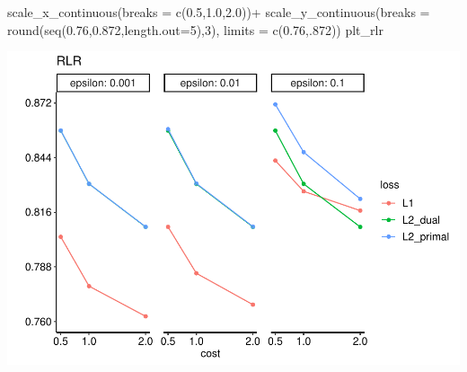 \documentclass[
]{article}
\newenvironment{Shaded}{\begin{snugshade}}{\end{snugshade}}
\newcommand{\AttributeTok}[1]{\textcolor[rgb]{0.77,0.63,0.00}{#1}}
\newcommand{\DecValTok}[1]{\textcolor[rgb]{0.00,0.00,0.81}{#1}}
\newcommand{\FloatTok}[1]{\textcolor[rgb]{0.00,0.00,0.81}{#1}}
\newcommand{\FunctionTok}[1]{\textcolor[rgb]{0.00,0.00,0.00}{#1}}
\newcommand{\NormalTok}[1]{#1}
\newcommand{\SpecialCharTok}[1]{\textcolor[rgb]{0.00,0.00,0.00}{#1}}
\begin{document}
\begin{Shaded}
\begin{Highlighting}[]
  \FunctionTok{scale\_x\_continuous}\NormalTok{(}\AttributeTok{breaks =} \FunctionTok{c}\NormalTok{(}\FloatTok{0.5}\NormalTok{,}\FloatTok{1.0}\NormalTok{,}\FloatTok{2.0}\NormalTok{))}\SpecialCharTok{+}
  \FunctionTok{scale\_y\_continuous}\NormalTok{(}\AttributeTok{breaks =} \FunctionTok{round}\NormalTok{(}\FunctionTok{seq}\NormalTok{(}\FloatTok{0.76}\NormalTok{,}\FloatTok{0.872}\NormalTok{,}\AttributeTok{length.out=}\DecValTok{5}\NormalTok{),}\DecValTok{3}\NormalTok{),}
                     \AttributeTok{limits =} \FunctionTok{c}\NormalTok{(}\FloatTok{0.76}\NormalTok{,.}\DecValTok{872}\NormalTok{))}
\NormalTok{plt\_rlr}
\end{Highlighting}
\end{Shaded}

\includegraphics{sl-inf-cairs-2301_files/figure-latex/optResults-1.pdf}
\end{document}
